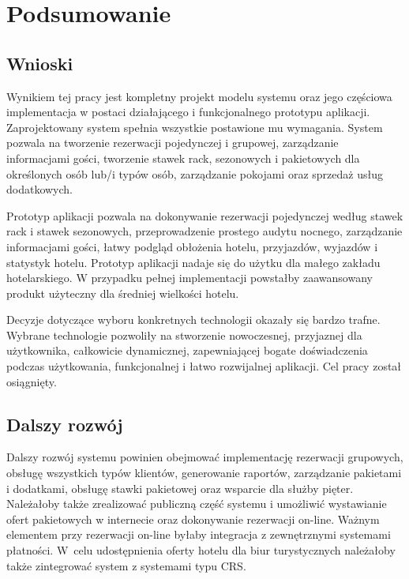 \documentclass[a4paper,onecolumn,oneside,11pt,wide,floatssmall]{mwrep}
\theoremstyle{definition}
\theoremstyle{plain}%
\theoremstyle{remark}
\begin{document}
\chapter{Podsumowanie}

\section{Wnioski}
Wynikiem tej pracy jest kompletny projekt modelu systemu oraz jego częściowa implementacja w postaci działającego i funkcjonalnego prototypu aplikacji. Zaprojektowany system spełnia wszystkie postawione mu wymagania. System pozwala na tworzenie rezerwacji pojedynczej i grupowej, zarządzanie informacjami gości, tworzenie stawek rack, sezonowych i pakietowych dla określonych osób lub/i typów osób, zarządzanie pokojami oraz sprzedaż usług dodatkowych.

Prototyp aplikacji pozwala na dokonywanie rezerwacji pojedynczej według stawek rack i stawek sezonowych, przeprowadzenie prostego audytu nocnego, zarządzanie informacjami gości, łatwy podgląd obłożenia hotelu, przyjazdów, wyjazdów i statystyk hotelu. Prototyp aplikacji nadaje się do użytku dla małego zakładu hotelarskiego. W przypadku pełnej implementacji powstałby zaawansowany produkt użyteczny dla średniej wielkości hotelu.

Decyzje dotyczące wyboru konkretnych technologii okazały się bardzo trafne. Wybrane technologie pozwoliły na stworzenie nowoczesnej, przyjaznej dla użytkownika, całkowicie dynamicznej, zapewniającej bogate doświadczenia podczas użytkowania, funkcjonalnej i łatwo rozwijalnej aplikacji. Cel pracy został osiągnięty.

\section{Dalszy rozwój}
Dalszy rozwój systemu powinien obejmować implementację rezerwacji grupowych, obsługę wszystkich typów klientów, generowanie raportów, zarządzanie pakietami i dodatkami, obsługę stawki pakietowej oraz wsparcie dla służby pięter. Należałoby także zrealizować publiczną część systemu i umożliwić wystawianie ofert pakietowych w internecie oraz dokonywanie rezerwacji on-line. Ważnym elementem przy rezerwacji on-line byłaby integracja z zewnętrznymi systemami płatności. \mbox{W celu} udostępnienia oferty hotelu dla biur turystycznych należałoby także zintegrować system z systemami typu CRS.


\appendix
\end{document}

